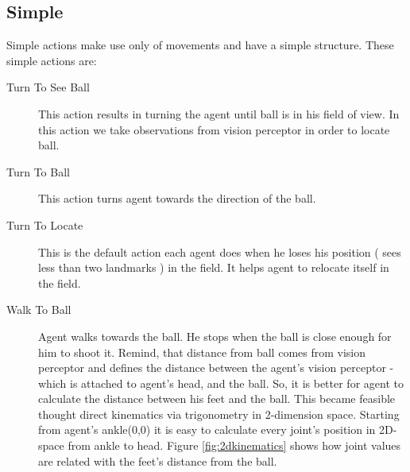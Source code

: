 \subsection{Simple}
Simple actions make use only of movements and have a simple structure. These simple actions are:
\begin{description}
 \item[Turn To See Ball] This action results in turning the agent until ball is in his field of view. In this action we take observations from vision perceptor in order to locate ball.
 
 \item[Turn To Ball] This action turns agent towards the direction of the ball.
 
 \item[Turn To Locate] This is the default action each agent does when he loses his position ( sees less than two landmarks ) in the field. It helps agent to relocate itself in the field.
 
 \item[Walk To Ball] Agent walks towards the ball. He stops when the ball is close enough for him to shoot it. Remind, that distance from ball comes from vision perceptor and defines the distance between the agent's vision perceptor - which is attached to agent's head, and the ball. So, it is better for agent to calculate the distance between his feet and the ball. This became feasible thought direct kinematics via trigonometry in 2-dimension space. Starting from agent's ankle(0,0) it is easy to calculate every joint's position in 2D-space from ankle to head. Figure \ref{fig:2dkinematics} shows how joint values are related with the feet's distance from the ball.
 

\end{description}
